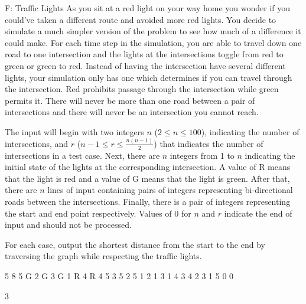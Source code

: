 \begin{problem}{F: Traffic Lights}
As you sit at a red light on your way home you wonder if you could’ve taken a different route and avoided more red lights. You decide to simulate a much simpler version of the problem to see how much of a difference it could make. For each time step in the simulation, you are able to travel down one road to one intersection and the lights at the intersections toggle from red to green or green to red. Instead of having the intersection have several different lights, your simulation only has one which determines if you can travel through the intersection. Red prohibits passage through the intersection while green permits it. There will never be more than one road between a pair of intersections and there will never be an intersection you cannot reach.
\end{problem}

\begin{formalin}
The input will begin with two integers $n$ ($2 \leq n \leq 100$), indicating the number of intersections, and $r$ ($n - 1 \leq r \leq \frac{n(n -1)}{2}$) that indicates the number of intersections in a test case. Next, there are $n$ integers from 1 to $n$ indicating the initial state of the lights at the corresponding intersection. A value of R means that the light is red and a value of G means that the light is green. After that, there are $n$ lines of input containing pairs of integers representing bi-directional roads between the intersections. Finally, there is a pair of integers representing the start and end point respectively. Values of 0 for $n$ and $r$ indicate the end of input and should not be processed.
\end{formalin}

\begin{formalout}
For each case, output the shortest distance from the start to the end by traversing the graph while respecting the traffic lights.
\end{formalout}

\begin{datain}
5 8
5 G
2 G
3 G
1 R
4 R
4 5
3 5
2 5
1 2
1 3
1 4
3 4
2 3
1 5
0 0
\end{datain}

\begin{dataout}
3
\end{dataout}

